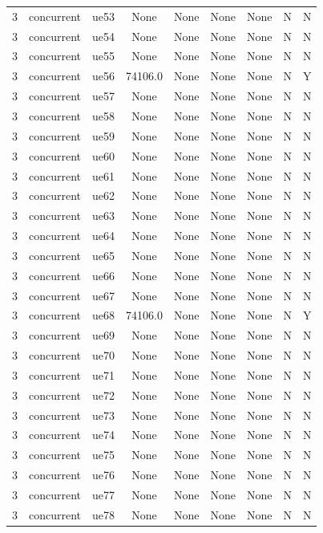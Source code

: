 \begin{table}[ht]
\begin{tabular}{|c|c|c|c|c|c|c|c|c|}
3 & concurrent & ue53 & None & None & None & None & N & N \\
3 & concurrent & ue54 & None & None & None & None & N & N \\
3 & concurrent & ue55 & None & None & None & None & N & N \\
3 & concurrent & ue56 & 74106.0 & None & None & None & N & Y \\
3 & concurrent & ue57 & None & None & None & None & N & N \\
3 & concurrent & ue58 & None & None & None & None & N & N \\
3 & concurrent & ue59 & None & None & None & None & N & N \\
3 & concurrent & ue60 & None & None & None & None & N & N \\
3 & concurrent & ue61 & None & None & None & None & N & N \\
3 & concurrent & ue62 & None & None & None & None & N & N \\
3 & concurrent & ue63 & None & None & None & None & N & N \\
3 & concurrent & ue64 & None & None & None & None & N & N \\
3 & concurrent & ue65 & None & None & None & None & N & N \\
3 & concurrent & ue66 & None & None & None & None & N & N \\
3 & concurrent & ue67 & None & None & None & None & N & N \\
3 & concurrent & ue68 & 74106.0 & None & None & None & N & Y \\
3 & concurrent & ue69 & None & None & None & None & N & N \\
3 & concurrent & ue70 & None & None & None & None & N & N \\
3 & concurrent & ue71 & None & None & None & None & N & N \\
3 & concurrent & ue72 & None & None & None & None & N & N \\
3 & concurrent & ue73 & None & None & None & None & N & N \\
3 & concurrent & ue74 & None & None & None & None & N & N \\
3 & concurrent & ue75 & None & None & None & None & N & N \\
3 & concurrent & ue76 & None & None & None & None & N & N \\
3 & concurrent & ue77 & None & None & None & None & N & N \\
3 & concurrent & ue78 & None & None & None & None & N & N \\

\end{tabular}
\end{table}
